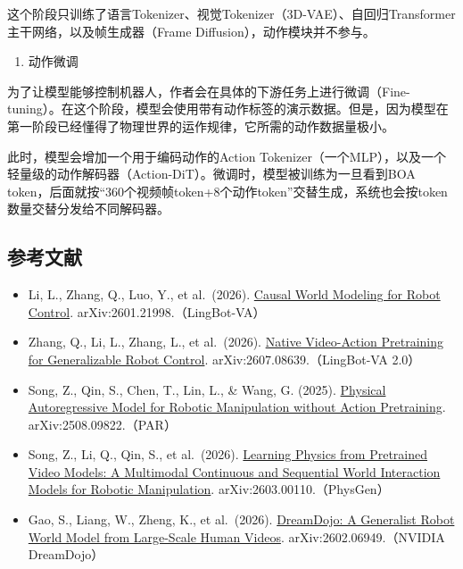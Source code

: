 这个阶段只训练了语言Tokenizer、视觉Tokenizer（3D-VAE）、自回归Transformer主干网络，以及帧生成器（Frame Diffusion），动作模块并不参与。

\begin{enumerate}
\def\labelenumi{\arabic{enumi}.}
\setcounter{enumi}{1}
\tightlist
\item
  动作微调
\end{enumerate}

为了让模型能够控制机器人，作者会在具体的下游任务上进行微调（Fine-tuning）。在这个阶段，模型会使用带有动作标签的演示数据。但是，因为模型在第一阶段已经懂得了物理世界的运作规律，它所需的动作数据量极小。

此时，模型会增加一个用于编码动作的Action Tokenizer（一个MLP），以及一个轻量级的动作解码器（Action-DiT）。微调时，模型被训练为一旦看到BOA token，后面就按``360个视频帧token+8个动作token''交替生成，系统也会按token数量交替分发给不同解码器。

\hypertarget{ux53c2ux8003ux6587ux732e-159}{%
\subsection{参考文献}\label{ux53c2ux8003ux6587ux732e-159}}

\vspace{0.25em}
\begin{itemize}
\tightlist
\item
  Li, L., Zhang, Q., Luo, Y., et al.~(2026). \href{https://arxiv.org/abs/2601.21998}{Causal World Modeling for Robot Control}. arXiv:2601.21998.（LingBot-VA）
\item
  Zhang, Q., Li, L., Zhang, L., et al.~(2026). \href{https://arxiv.org/abs/2607.08639}{Native Video-Action Pretraining for Generalizable Robot Control}. arXiv:2607.08639.（LingBot-VA 2.0）
\item
  Song, Z., Qin, S., Chen, T., Lin, L., \& Wang, G. (2025). \href{https://arxiv.org/abs/2508.09822}{Physical Autoregressive Model for Robotic Manipulation without Action Pretraining}. arXiv:2508.09822.（PAR）
\item
  Song, Z., Li, Q., Qin, S., et al.~(2026). \href{https://arxiv.org/abs/2603.00110}{Learning Physics from Pretrained Video Models: A Multimodal Continuous and Sequential World Interaction Models for Robotic Manipulation}. arXiv:2603.00110.（PhysGen）
\item
  Gao, S., Liang, W., Zheng, K., et al.~(2026). \href{https://arxiv.org/abs/2602.06949}{DreamDojo: A Generalist Robot World Model from Large-Scale Human Videos}. arXiv:2602.06949.（NVIDIA DreamDojo）
\end{itemize}

